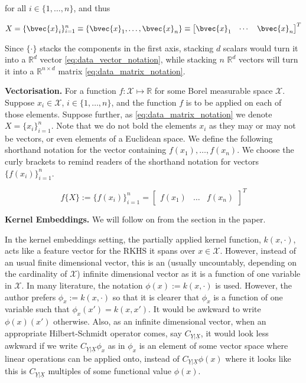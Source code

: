 \documentclass[twoside]{article} \usepackage{aistats2017}
\newcommand{\rv}[1]{\underline{#1}}
\newcommand{\warn}[1]{{\color{red} #1}}
\begin{document}
	for all $i \in \{1, \dots, n\}$, and thus

	\begin{equation}
		X = \{\bvec{x}_{i}\}_{i = 1}^{n} \equiv \{\bvec{x}_{1}, \dots, \bvec{x}_{n}\} \equiv \begin{bmatrix}
			\bvec{x}_{1} & \cdots & \bvec{x}_{n}
		\end{bmatrix}^{T}
	\label{eq:data_matrix_notation}
	\end{equation}
		
	Since $\{ \cdot \}$ stacks the components in the first axis, stacking $d$ scalars would turn it into a $\mathbb{R}^{d}$ vector \eqref{eq:data_vector_notation}, while stacking $n$ $\mathbb{R}^{d}$ vectors will turn it into a $\mathbb{R}^{n \times d}$ matrix \eqref{eq:data_matrix_notation}.
	
	\textbf{Vectorisation.} For a function $f : \mathcal{X} \mapsto \mathbb{R}$ for some Borel measurable space $\mathcal{X}$. Suppose $x_{i} \in \mathcal{X}$, $i \in \{1, \dots, n\}$, and the function $f$ is to be applied on each of those elements. Suppose further, as \eqref{eq:data_matrix_notation} we denote $X = \{x_{i}\}_{i = 1}^{n}$. Note that we do not bold the elements $x_{i}$ as they may or may not be vectors, or even elements of a Euclidean space. We define the following shorthand notation for the vector containing $f(x_{1}), \dots, f(x_{n})$. We choose the curly brackets to remind readers of the shorthand notation for vectors $\{f(x_{i})\}_{i = 1}^{n}$.
	
	\begin{equation}
		f\{X\} := \{f(x_{i})\}_{i = 1}^{n} = {\begin{bmatrix} f(x_{1}) & \dots & f(x_{n}) \end{bmatrix}}^{T}
	\end{equation}
	
	\textbf{Kernel Embeddings.} \warn{We will follow on from the section in the paper.}
	
	In the kernel embeddings setting, the partially applied kernel function, $k(x, \cdot)$, acts like a feature vector for the RKHS it spans over $x \in \mathcal{X}$. However, instead of an usual finite dimensional vector, this is an (usually uncountably, depending on the cardinality of $\mathcal{X}$) infinite dimensional vector as it is a function of one variable in $\mathcal{X}$. In many literature, the notation $\phi(x) := k(x, \cdot)$ is used. However, the author prefers $\phi_{x} := k(x, \cdot)$ so that it is clearer that $\phi_{x}$ is a function of one variable such that $\phi_{x}(x') = k(x, x')$. It would be awkward to write $\phi(x)(x')$ otherwise. Also, as an infinite dimensional vector, when an appropriate Hilbert-Schmidt operator comes, say $C_{\rv{Y} | \rv{X}}$, it would look less awkward if we write $C_{\rv{Y} | \rv{X}} \phi_{x}$ as in $\phi_{x}$ is an element of some vector space where linear operations can be applied onto, instead of $C_{\rv{Y} | \rv{X}} \phi(x)$ where it looks like this is $C_{\rv{Y} | \rv{X}}$ multiples of some functional value $\phi(x)$.
	
\end{document}
